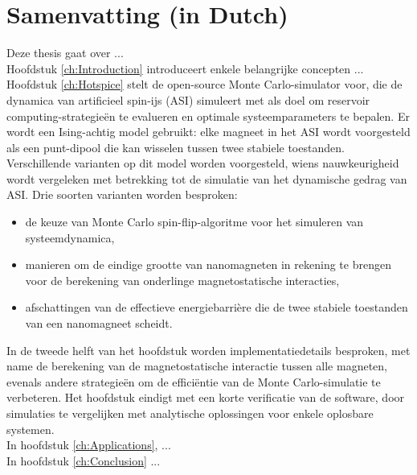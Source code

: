 \chapter*{Samenvatting (in Dutch)}

Deze thesis gaat over ... \\

Hoofdstuk \ref{ch:Introduction} introduceert enkele belangrijke concepten ... \\

Hoofdstuk \ref{ch:Hotspice} stelt de open-source \hotspice Monte Carlo-simulator voor, die de dynamica van artificieel spin-ijs (ASI) simuleert met als doel om reservoir computing-strategieën te evalueren en optimale systeemparameters te bepalen.
Er wordt een Ising-achtig model gebruikt: elke magneet in het ASI wordt voorgesteld als een punt-dipool die kan wisselen tussen twee stabiele toestanden.
Verschillende varianten op dit model worden voorgesteld, wiens nauwkeurigheid wordt vergeleken met betrekking tot de simulatie van het dynamische gedrag van ASI.
Drie soorten varianten worden besproken:
\begin{itemize}[noitemsep,nolistsep] %
	\item de keuze van Monte Carlo spin-flip-algoritme voor het simuleren van systeemdynamica,
	\item manieren om de eindige grootte van nanomagneten in rekening te brengen voor de berekening van onderlinge magnetostatische interacties,
	\item afschattingen van de effectieve energiebarri\`ere die de twee stabiele toestanden van een nanomagneet scheidt.
\end{itemize}
In de tweede helft van het hoofdstuk worden implementatiedetails besproken, met name de berekening van de magnetostatische interactie tussen alle magneten, evenals andere strategie\"en om de effici\"entie van de Monte Carlo-simulatie te verbeteren.
Het hoofdstuk eindigt met een korte verificatie van de software, door simulaties te vergelijken met analytische oplossingen voor enkele oplosbare systemen. \\

In hoofdstuk \ref{ch:Applications}, ... \\

In hoofdstuk \ref{ch:Conclusion} ...
